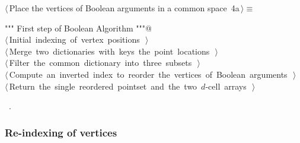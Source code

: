 \documentclass[11pt,oneside]{article}	%
\begin{document}
\begin{flushleft} \small \label{scrap3}
\protect{}$\langle\,$Place the vertices of Boolean arguments in a common space\nobreak\ {\footnotesize 4a}$\,\rangle\equiv$
\vspace{-1ex}
\begin{list}{}{} \item
\mbox{}\verb@""" First step of Boolean Algorithm """@\\
\mbox{}\verb@@\hbox{$\langle\,$Initial indexing of vertex positions\nobreak\ {\footnotesize {}}$\,\rangle$}\verb@@\\
\mbox{}\verb@@\hbox{$\langle\,$Merge two dictionaries with keys the point locations\nobreak\ {\footnotesize {}}$\,\rangle$}\verb@@\\
\mbox{}\verb@@\hbox{$\langle\,$Filter the common dictionary into three subsets\nobreak\ {\footnotesize {}}$\,\rangle$}\verb@@\\
\mbox{}\verb@@\hbox{$\langle\,$Compute an inverted index to reorder the vertices of Boolean arguments\nobreak\ {\footnotesize {}}$\,\rangle$}\verb@@\\
\mbox{}\verb@@\hbox{$\langle\,$Return the single reordered pointset and the two $d$-cell arrays\nobreak\ {\footnotesize {}}$\,\rangle$}\verb@@\\
\mbox{}\verb@@{\NWsep}
\end{list}
\vspace{-1ex}
\footnotesize\addtolength{\baselineskip}{-1ex}
\begin{list}{}{\setlength{\itemsep}{-\parsep}\setlength{\itemindent}{-\leftmargin}}
\item \NWtxtMacroRefIn\ .
\end{list}
\end{flushleft}

\subsubsection{Re-indexing of vertices}
\end{document}
